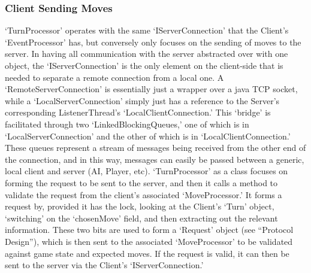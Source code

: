 \documentclass[a4paper,doc,draftfirst]{apa6}
\begin{document}
\subsubsection{Client Sending Moves}
‘TurnProcessor’ operates with the same ‘IServerConnection’ that the Client’s ‘EventProcessor’ has, but conversely only focuses on the sending of moves to the server. In having all communication with the server abstracted over with one object, the ‘IServerConnection’ is the only element on the client-side that is needed to separate a remote connection from a local one. A ‘RemoteServerConnection’ is essentially just a wrapper over a java TCP socket, while a ‘LocalServerConnection’ simply just has a reference to the Server’s corresponding ListenerThread’s ‘LocalClientConnection.’ This ‘bridge’ is facilitated through two ‘LinkedBlockingQueues,’ one of which is in ‘LocalServerConnection’ and the other of which is in ‘LocalClientConnection.’ These queues represent a stream of messages being received from the other end of the connection, and in this way, messages can easily be passed between a generic, local client and server (AI, Player, etc). ‘TurnProcessor’ as a class focuses on forming the request to be sent to the server, and then it calls a method to validate the request from the client’s associated ‘MoveProcessor.’ It forms a request by, provided it has the lock, looking at the Client’s ‘Turn’ object, ‘switching’ on the ‘chosenMove’ field, and then extracting out the relevant information. These two bits are used to form a ‘Request’ object (see  “Protocol Design”), which is then sent to the associated ‘MoveProcessor’ to be validated against game state and expected moves. If the request is valid, it can then be sent to the server via the Client’s ‘IServerConnection.’
\end{document}
